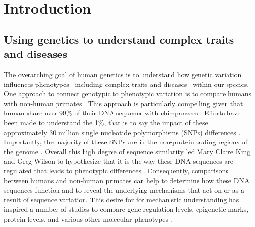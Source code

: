 \chapter{Introduction}

\section{Using genetics to understand complex traits and diseases}

The overarching goal of human genetics is to understand how genetic variation influences phenotypes-- including complex traits and diseases-- within our species.  One approach to connect genotypic to phenotypic variation is to compare humans with non-human primates \cite{RN1343}. This approach is particularly compelling given that human share over 99\% of their DNA sequence with chimpanzees \cite{RN1929, RN2115}. Efforts have been made to understand the 1\%, that is to say the impact of these approximately 30 million single nucleotide polymorphisms (SNPs) differences \cite{RN3426, RN1929, RN2115, RN1342}. Importantly, the majority of these SNPs are in the non-protein coding regions of the genome \cite{RN1343}.  
Overall this high degree of sequence similarity led Mary Claire King and Greg Wilson to hypothesize that it is the way these DNA sequences are regulated that leads to phenotypic differences \cite{RN1343}. Consequently, comparisons between humans and non-human primates can help to determine how these DNA sequences function and to reveal the underlying mechanisms that act on or as a result of sequence variation. This desire for for mechanistic understanding has inspired a number of studies to compare gene regulation levels, epigenetic marks, protein levels, and various other molecular phenotypes \cite{RN3251, RN2106, RN1, RN1931, RN1929, RN3285, RN2110, RN2111, RN2113, RN2091, RN3288, RN1966, RN3286, RN3284}. 
